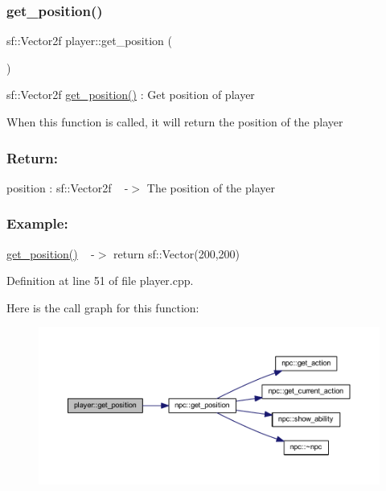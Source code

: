 \subsubsection{\texorpdfstring{get\+\_\+position()}{get\_position()}}
{\footnotesize\ttfamily sf\+::\+Vector2f player\+::get\+\_\+position (\begin{DoxyParamCaption}{ }\end{DoxyParamCaption})}



sf\+::\+Vector2f \hyperlink{classplayer_a78d420774623e89cd896d3cb1d265b17}{get\+\_\+position()} \+: Get position of player 

When this function is called, it will return the position of the player

\subsubsection*{Return\+: }

position \+: sf\+::\+Vector2f ~\newline
-\/$>$ The position of the player

\subsubsection*{Example\+: }

\hyperlink{classplayer_a78d420774623e89cd896d3cb1d265b17}{get\+\_\+position()} ~\newline
-\/$>$ return sf\+::\+Vector(200,200) 

Definition at line 51 of file player.\+cpp.

Here is the call graph for this function\+:
\nopagebreak
\begin{figure}[H]
\begin{center}
\leavevmode
\includegraphics[width=350pt]{classplayer_a78d420774623e89cd896d3cb1d265b17_cgraph}
\end{center}
\end{figure}
\mbox{\label{classplayer_a0f6538451ec51b4407cca22294451443}} 
